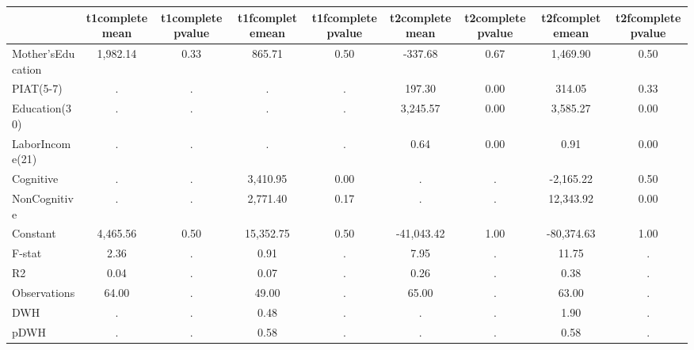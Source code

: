 \begin{table}[htbp]
\begin{tabular}{lcccccccc} \hline \hline
 & t1completemean  & t1completepvalue  & t1fcompletemean  & t1fcompletepvalue  & t2completemean  & t2completepvalue  & t2fcompletemean  & t2fcompletepvalue  \\  \hline 
Mother'sEducation &     1,982.14 &         0.33 &       865.71 &         0.50 &      -337.68 &         0.67 &     1,469.90 &         0.50 \\  
PIAT(5-7) &            . &            . &            . &            . &       197.30 &         0.00 &       314.05 &         0.33 \\  
Education(30) &            . &            . &            . &            . &     3,245.57 &         0.00 &     3,585.27 &         0.00 \\  
LaborIncome(21) &            . &            . &            . &            . &         0.64 &         0.00 &         0.91 &         0.00 \\  
Cognitive &            . &            . &     3,410.95 &         0.00 &            . &            . &    -2,165.22 &         0.50 \\  
NonCognitive &            . &            . &     2,771.40 &         0.17 &            . &            . &    12,343.92 &         0.00 \\  
Constant &     4,465.56 &         0.50 &    15,352.75 &         0.50 &   -41,043.42 &         1.00 &   -80,374.63 &         1.00 \\  
F-stat &         2.36 &            . &         0.91 &            . &         7.95 &            . &        11.75 &            . \\  
R2 &         0.04 &            . &         0.07 &            . &         0.26 &            . &         0.38 &            . \\  
Observations &        64.00 &            . &        49.00 &            . &        65.00 &            . &        63.00 &            . \\  
DWH &            . &            . &         0.48 &            . &            . &            . &         1.90 &            . \\  
pDWH &            . &            . &         0.58 &            . &            . &            . &         0.58 &            . \\  
\hline \hline \end{tabular}
\end{table}
